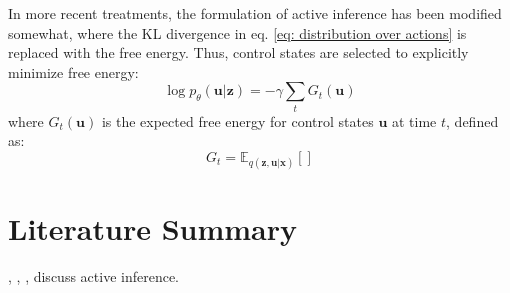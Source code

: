 In more recent treatments, the formulation of active inference has been modified somewhat, where the KL divergence in eq. \ref{eq: distribution over actions} is replaced with the free energy. Thus, control states are selected to explicitly minimize free energy:
\begin{equation}
    \log p_\theta (\mathbf{u} | \mathbf{z}) = - \gamma \sum_t G_t (\mathbf{u})
\end{equation}
where $G_t (\mathbf{u})$ is the expected free energy for control states $\mathbf{u}$ at time $t$, defined as:
\begin{equation}
    G_t = \mathbb{E}_{q (\mathbf{z}, \mathbf{u} | \mathbf{x})} \left[  \right]
\end{equation}


\section{Literature Summary}

\noindent \cite{friston2011action}, \cite{friston2013anatomy} , \cite{friston2015active} \cite{friston2016active_process}, \cite{friston2016active} discuss active inference.
